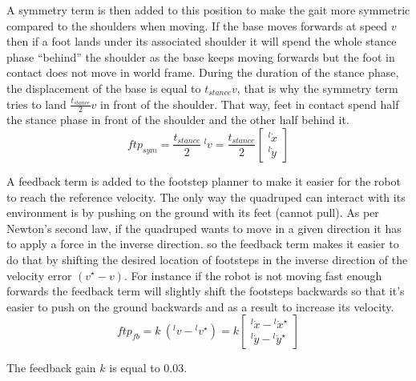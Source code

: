 \documentclass[a4paper,11pt]{article}
\begin{document}
A symmetry term is then added to this position to make the gait more symmetric compared to the shoulders when moving. If the base moves forwards at speed $v$ then if a foot lands under its associated shoulder it will spend the whole stance phase ``behind'' the shoulder as the base keeps moving forwards but the foot in contact does not move in world frame. During the duration of the stance phase, the displacement of the base is equal to $t_{stance} v$, that is why the symmetry term tries to land $\frac{t_{stance}}{2} v$ in front of the shoulder. That way, feet in contact spend half the stance phase in front of the shoulder and the other half behind it.
\begin{equation}
{ftp}_{sym} = \frac{t_{stance}}{2} ~ {}^l\!v = \frac{t_{stance}}{2} \begin{bmatrix} {}^l\!\dot x \\ {}^l\!\dot y \end{bmatrix}
\end{equation}

A feedback term is added to the footstep planner to make it easier for the robot to reach the reference velocity. The only way the quadruped can interact with its environment is by pushing on the ground with its feet (cannot pull). As per Newton's second law, if the quadruped wants to move in a given direction it has to apply a force in the inverse direction. so the feedback term makes it easier to do that by shifting the desired location of footsteps in the inverse direction of the velocity error $(v^\star-v)$. For instance if the robot is not moving fast enough forwards the feedback term will slightly shift the footsteps backwards so that it's easier to push on the ground backwards and as a result to increase its velocity.
\begin{equation}
{ftp}_{fb} = k ~ ({}^l\!v - {}^l\!v^\star) = k \begin{bmatrix} {}^l\!\dot x - {}^l\!\dot x^\star \\ {}^l\!\dot y - {}^l\!\dot y^\star \end{bmatrix}
\end{equation}

The feedback gain $k$ is equal to 0.03.
\end{document}
